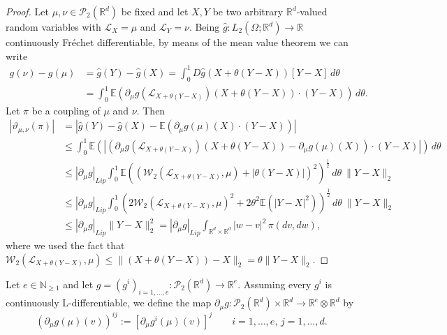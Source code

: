 \documentclass[10pt, a4paper]{article} %
\newcommand{\R}{\mathbb{R}}
\newcommand{\E}{\mathbb{E}}
\theoremstyle{definition}
\theoremstyle{plain}
\begin{document}
    \begin{proof}
        Let $\mu,\nu \in \mathcal{P}_2(\R^d)$ be fixed and let $X,Y$ be two arbitrary $\R^d$-valued random variables with $\mathcal{L}_X=\mu$ and $\mathcal{L}_Y = \nu$. 
        Being $\hat{g}:L_2(\Omega;\R^d) \to \R$ continuously Fréchet differentiable, by means of the mean value theorem we can write \begin{align*}
            g(\nu) - g(\mu) &= \hat{g}(Y) - \hat{g}(X) = \int_0^1 D\hat{g}(X + \theta(Y-X)) [Y-X] \, d\theta  \\ 
            &= \int_0^1 \E(\partial_\mu g(\mathcal{L}_{X + \theta(Y-X)}) (X + \theta(Y-X)) \cdot (Y-X) ) \, d\theta .
        \end{align*}
        Let $\pi$ be a coupling of $\mu$ and $\nu$. Then 
        \begin{equation*} 
            \begin{split}
                |\vartheta_{\mu,\nu} ( \pi)| &= |\hat{g}(Y) - \hat{g}(X) - \E(\partial_\mu g(\mu)(X) \cdot (Y-X))| \\
                &\le \int_0^1 \E(|(\partial_\mu g(\mathcal{L}_{X + \theta(Y-X)}) (X + \theta(Y-X)) - \partial_\mu g(\mu) (X) )\cdot (Y-X)|) \, d\theta \\
                &\le |\partial_\mu g|_{Lip} \int_0^1 \E((\mathcal{W}_2(\mathcal{L}_{X + \theta (Y-X)},\mu) + | \theta (Y-X)|)^2)^\frac12 \, d\theta \  \|Y-X\|_2 \\
                &\le |\partial_\mu g|_{Lip} \int_0^1 (2 \mathcal{W}_2(\mathcal{L}_{X + \theta (Y-X)},\mu)^2 + 2\theta^2 \E(|Y-X|^2))^\frac12 \, d\theta \ \|Y-X\|_2 \\
                &\le |\partial_\mu g|_{Lip} \|Y-X\|_2^2 =  |\partial_\mu g|_{Lip}  \int_{\R^d \times \R^d} |w-v|^2 \, \pi(dv,dw),
            \end{split}
        \end{equation*}
        where we used the fact that $\mathcal{W}_2(\mathcal{L}_{X + \theta (Y-X)},\mu) \le \| (X + \theta (Y-X)) - X\|_2 = \theta \|Y-X\|_2 $.
    \end{proof}



    \noindent Let $e \in \mathbb{N}_{\ge 1}$ and let $g=(g^i)_{i=1,\dots,e}:\mathcal{P}_2(\R^d) \to \R^e$. Assuming every $g^i$ is continuously L-differentiable, we define the map $\partial_\mu g:\mathcal{P}_2(\R^d) \times \R^d \to \R^e \otimes \R^d$ by \begin{equation*} 
        (\partial_\mu g(\mu)(v))^{ij} := [\partial_\mu g^i (\mu) (v) ]^j \qquad i=1,\dots,e, \, j=1,\dots,d .  
    \end{equation*}
\end{document}
